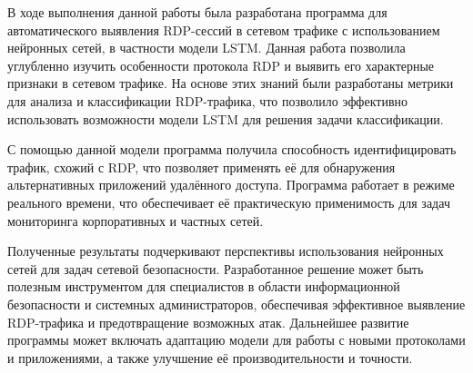 \documentclass[bachelor, och, coursework]{SCWorks}
\begin{document}

\conclusion
  
В ходе выполнения данной работы была разработана программа для автоматического выявления RDP-сессий в сетевом трафике с 
использованием нейронных сетей, в частности модели LSTM. Данная работа позволила углубленно изучить особенности протокола 
RDP и выявить его характерные признаки в сетевом трафике. На основе этих знаний были разработаны метрики для анализа и 
классификации RDP-трафика, что позволило эффективно использовать возможности модели LSTM для решения задачи классификации.

С помощью данной модели программа получила способность идентифицировать трафик, схожий с RDP, что 
позволяет применять её для обнаружения альтернативных приложений удалённого доступа. Программа работает в режиме 
реального времени, что обеспечивает её практическую применимость для задач мониторинга корпоративных и частных сетей.

Полученные результаты подчеркивают перспективы использования нейронных сетей для задач сетевой безопасности. Разработанное решение 
может быть полезным инструментом для специалистов в области информационной безопасности и системных администраторов, обеспечивая 
эффективное выявление RDP-трафика и предотвращение возможных атак. Дальнейшее развитие программы может включать адаптацию модели 
для работы с новыми протоколами и приложениями, а также улучшение её производительности и точности.
\end{document}
